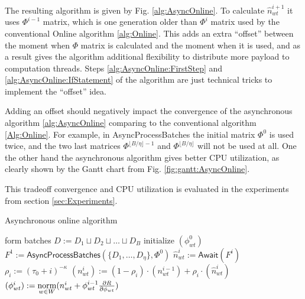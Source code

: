 \documentclass[russian,english]{llncs}
\newcommand{\norm}{\mathop{\rm norm}\limits}
\newcommand{\kw}[1]{\textsf{#1}}
\begin{document}
The resulting algorithm is given by Fig. \ref{alg:AsyncOnline}.
To calculate $\hat n^{i+1}_{wt}$ it uses $\Phi^{i-1}$ matrix,
which is one generation older than $\Phi^{i}$ matrix used by the conventional \kw{Online algorithm} \ref{alg:Online}.
This adds an extra ``offset'' between the moment when $\Phi$ matrix is calculated and the moment when it is used,
and as a result gives the algorithm additional flexibility to distribute more payload to computation threads.
Steps \ref{alg:AsyncOnline:FirstStep} and \ref{alg:AsyncOnline:IfStatement} of the algorithm
are just technical tricks to implement the ``offset'' idea.

Adding an offset should negatively impact the convergence of the asynchronous algorithm \ref{alg:AsyncOnline}
comparing to the conventional algorithm \ref{Alg:Online}.
For example, in \kw{AsyncProcessBatches} the initial matrix $\Phi^0$ is used twice,
and the two last matrices $\Phi^{\lfloor B / \eta \rfloor - 1}$ and $\Phi^{\lfloor B / \eta \rfloor}$ will not be used at all.
One the other hand the asynchronous algorithm gives better CPU utilization,
as clearly shown by the Gantt chart from Fig. \ref{fig:gantt:AsyncOnline}.

This tradeoff convergence and CPU utilization is evaluated in the experiments from section \ref{sec:Experiments}.

\SetAlgoSkip{}
\begin{algorithm2e}[h]
\caption{Asynchronous online algorithm} %
\label{alg:AsyncOnline}
\BlankLine
{}
\BlankLine
form batches $D := D_1 \sqcup D_2 \sqcup \dots \sqcup D_B$\;
initialize $(\phi^0_{wt})$\;
$F^1 := \kw{AsyncProcessBatches}(\{D_{1}, \dots, D_{\eta}\}, \Phi^0)$\;
\label{alg:AsyncOnline:FirstStep}
 {
    \If{$i \neq \lfloor B / \eta \rfloor$}{
        \label{alg:AsyncOnline:IfStatement}
        $F^{i+1} := \kw{AsyncProcessBatches}(\{D_{\eta i + 1}, \dots, D_{\eta i + \eta}\}, \Phi^{i-1})$\;
    }
    $\hat n^i_{wt} := \kw{Await}(F^i)$\;
    $\rho_i := (\tau_0 + i)^{-\kappa}$\;
    $(n^{i}_{wt}) := (1 - \rho_i) \cdot (n^{i-1}_{wt}) + \rho_i \cdot (\hat n^{i}_{wt})$\;
    $(\phi^{i}_{wt}) := \norm_{w \in W} (n^{i}_{wt} + \phi^{i-1}_{wt} \frac{\partial R}{\partial \phi_{wt}})$\;
}
\end{algorithm2e}
\end{document}
